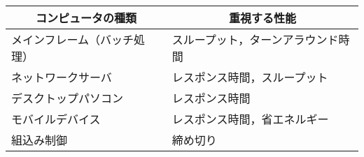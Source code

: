 \documentclass{standalone}
\begin{document}
\begin{tabular}{l|l}
\hline\hline
\multicolumn{1}{c}{コンピュータの種類} & \multicolumn{1}{|c}{重視する性能} \\
\hline
メインフレーム（バッチ処理）       & スループット，ターンアラウンド時間 \\
ネットワークサーバ                 & レスポンス時間，スループット \\
デスクトップパソコン               & レスポンス時間 \\
モバイルデバイス                   & レスポンス時間，省エネルギー \\
組込み制御                         & 締め切り \\
\end{tabular}
\end{document}
